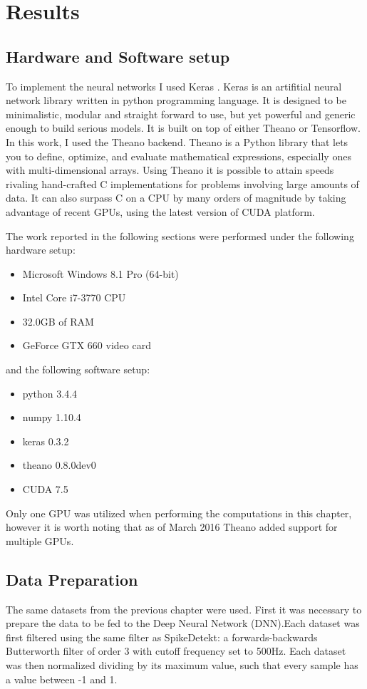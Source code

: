 \section{Results}
\label{sec:DL-results}

\subsection{Hardware and Software setup}
\label{subsec:hardware-software}
To implement the neural networks I used Keras \cite{chollet2015keras}. Keras is an artifitial neural network library written in python programming language. It is designed to be minimalistic, modular and straight forward to use, but yet powerful and generic enough to build serious models. It is built on top of either Theano or Tensorflow. In this work, I used the Theano backend. Theano is a Python library that lets you to define, optimize, and evaluate mathematical expressions, especially ones with multi-dimensional arrays. Using Theano it is possible to attain speeds rivaling hand-crafted C implementations for problems involving large amounts of data. It can also surpass C on a CPU by many orders of magnitude by taking advantage of recent GPUs, using the latest version of CUDA platform. \cite{theano2010} \cite{theano2012}

The work reported in the following sections were performed under the following hardware setup:
\begin{itemize}
\item Microsoft Windows 8.1 Pro (64-bit)
\item Intel Core i7-3770 CPU
\item 32.0GB of RAM
\item GeForce GTX 660 video card
\end{itemize}

\noindent 
and the following software setup:
\begin{itemize}
\item python 3.4.4
\item numpy 1.10.4
\item keras 0.3.2
\item theano 0.8.0dev0
\item CUDA 7.5
\end{itemize}

Only one GPU was utilized when performing the computations in this chapter, however it is worth noting that as of March 2016 Theano added support for multiple GPUs.

\subsection{Data Preparation}
\label{subsec:data-preparation}
The same datasets from the previous chapter were used. First it was necessary to prepare the data to be fed to the Deep Neural Network (DNN).Each dataset was first filtered using the same filter as SpikeDetekt: a forwards-backwards Butterworth filter of order 3 with cutoff frequency set to 500Hz. Each dataset was then normalized dividing by its maximum value, such that every sample has a value between -1 and 1.

